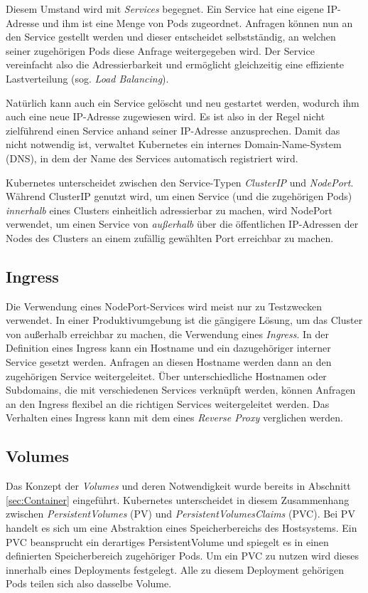\documentclass[11pt,a4paper]{article}
\begin{document}
Diesem Umstand wird mit \emph{Services} begegnet. Ein Service hat eine eigene IP-Adresse und ihm ist eine Menge
von Pods zugeordnet. Anfragen können nun an den Service gestellt werden und dieser entscheidet selbstständig,
an welchen seiner zugehörigen Pods diese Anfrage weitergegeben wird. Der Service vereinfacht also die
Adressierbarkeit und ermöglicht gleichzeitig eine effiziente Lastverteilung (sog. \emph{Load Balancing}).

Natürlich kann auch ein Service gelöscht und neu gestartet werden, wodurch ihm auch eine neue IP-Adresse zugewiesen wird.
Es ist also in der Regel nicht zielführend einen Service anhand seiner IP-Adresse anzusprechen.
Damit das nicht notwendig ist, verwaltet Kubernetes ein internes Domain-Name-System (DNS), in dem
der Name des Services automatisch registriert wird.

Kubernetes unterscheidet zwischen den Service-Typen \emph{ClusterIP} und \emph{NodePort}.
Während ClusterIP genutzt wird, um einen Service (und die zugehörigen Pods) \emph{innerhalb} eines Clusters
einheitlich adressierbar zu machen, wird NodePort verwendet, um einen Service von \emph{außerhalb}
über die öffentlichen IP-Adressen der Nodes des Clusters an einem zufällig gewählten Port erreichbar zu machen.

\subsection{Ingress}
\label{sec:Ingress}
Die Verwendung eines NodePort-Services wird meist nur zu Testzwecken verwendet. In einer Produktivumgebung
ist die gängigere Lösung, um das Cluster von außerhalb erreichbar zu machen, die Verwendung eines \emph{Ingress}.
In der Definition eines Ingress kann ein Hostname und ein dazugehöriger interner Service gesetzt werden.
Anfragen an diesen Hostname werden dann an den zugehörigen Service weitergeleitet. Über unterschiedliche Hostnamen
oder Subdomains, die mit verschiedenen Services verknüpft werden, können Anfragen an den Ingress flexibel
an die richtigen Services weitergeleitet werden. Das Verhalten eines Ingress kann mit dem eines \emph{Reverse Proxy}
verglichen werden.


\subsection{Volumes}
Das Konzept der \emph{Volumes} und deren Notwendigkeit wurde bereits in Abschnitt \ref{sec:Container} eingeführt.
Kubernetes unterscheidet in diesem Zusammenhang zwischen \emph{PersistentVolumes} (PV) und \emph{PersistentVolumesClaims} (PVC).
Bei PV handelt es sich um eine Abstraktion eines Speicherbereichs des Hostsystems.
Ein PVC beansprucht ein derartiges PersistentVolume und spiegelt es in einen
definierten Speicherbereich zugehöriger Pods. Um ein PVC zu nutzen wird dieses innerhalb eines Deployments festgelegt.
Alle zu diesem Deployment gehörigen Pods teilen sich also dasselbe Volume.
\end{document}
